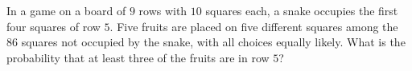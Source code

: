 In a game on a board of $9$ rows with $10$ squares each, a snake occupies the first four squares of row $5$. Five fruits are placed on five different squares among the $86$ squares not occupied by the snake, with all choices equally likely. What is the probability that at least three of the fruits are in row $5$?
